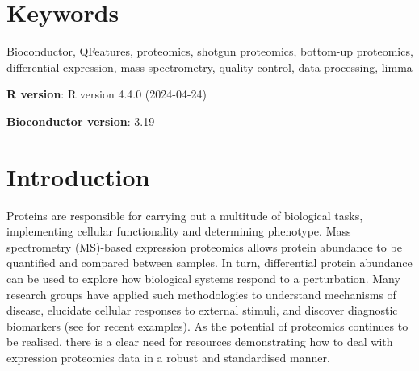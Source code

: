 \documentclass[9pt,a4paper,]{extarticle}
\begin{document}
\section*{Keywords}
Bioconductor, QFeatures, proteomics, shotgun proteomics, bottom-up proteomics,
differential expression, mass spectrometry, quality control, data processing,
limma


\clearpage
\pagestyle{main}

\textbf{R version}: R version 4.4.0 (2024-04-24)

\textbf{Bioconductor version}: 3.19

\section{Introduction}\label{introduction}

Proteins are responsible for carrying out a multitude of biological tasks,
implementing cellular functionality and determining phenotype. Mass spectrometry
(MS)-based expression proteomics allows protein abundance to be quantified and
compared between samples. In turn, differential protein abundance can be used to
explore how biological systems respond to a perturbation. Many research groups
have applied such methodologies to understand mechanisms of disease, elucidate
cellular responses to external stimuli, and discover diagnostic biomarkers (see
\citep{PinaJimnez2021, AmiriDashatan2021, Anitua2018} for recent examples). As the
potential of proteomics continues to be realised, there is a clear need for
resources demonstrating how to deal with expression proteomics data in a robust
and standardised manner.
\end{document}
